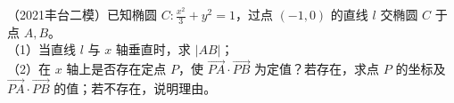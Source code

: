 \begin{example} %
（2021丰台二模）已知椭圆 $C:\frac{x^2}{3}+y^2=1$，过点 $(-1,0)$ 的直线 $l$ 交椭圆 $C$ 于点 $A,B$。\\
（1）当直线 $l$ 与 $x$ 轴垂直时，求 $\lvert AB\rvert$；\\
（2）在 $x$ 轴上是否存在定点 $P$，使 $\overrightarrow{PA}\cdot\overrightarrow{PB}$ 为定值？若存在，求点 $P$ 的坐标及 $\overrightarrow{PA}\cdot\overrightarrow{PB}$ 的值；若不存在，说明理由。
\end{example}
